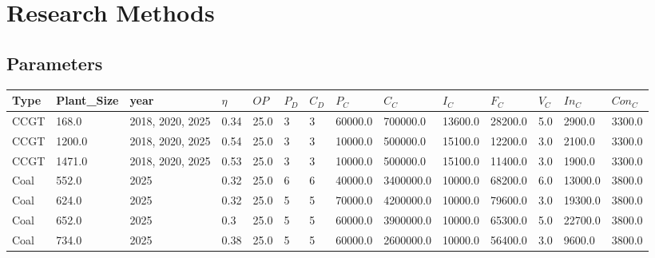\documentclass[sigconf]{acmart}
\begin{document}
%



% 
\appendix

\section{Research Methods}

\subsection{Parameters}

\begin{table*}[]
	\begin{tabularx}{\linewidth}{|p{}|l|l|l|l|l|l|l|l|l|l|l|l|l|}
\hline
Type                          & Plant\_Size & year             & $\eta$ & $OP$ & $P_D$ & $C_D$ & $P_C$    & $C_C$     & $I_C$    & $F_C$   & $V_C$ & $In_C$  & $Con_C$  \\ \hline
CCGT                          & 168.0       & 2018, 2020, 2025 & 0.34   & 25.0 & 3     & 3     & 60000.0  & 700000.0  & 13600.0  & 28200.0 & 5.0   & 2900.0  & 3300.0   \\ \hline
CCGT                          & 1200.0      & 2018, 2020, 2025 & 0.54   & 25.0 & 3     & 3     & 10000.0  & 500000.0  & 15100.0  & 12200.0 & 3.0   & 2100.0  & 3300.0   \\ \hline
CCGT                          & 1471.0      & 2018, 2020, 2025 & 0.53   & 25.0 & 3     & 3     & 10000.0  & 500000.0  & 15100.0  & 11400.0 & 3.0   & 1900.0  & 3300.0   \\ \hline
Coal                          & 552.0       & 2025             & 0.32   & 25.0 & 6     & 6     & 40000.0  & 3400000.0 & 10000.0  & 68200.0 & 6.0   & 13000.0 & 3800.0   \\ \hline
Coal                          & 624.0       & 2025             & 0.32   & 25.0 & 5     & 5     & 70000.0  & 4200000.0 & 10000.0  & 79600.0 & 3.0   & 19300.0 & 3800.0   \\ \hline
Coal                          & 652.0       & 2025             & 0.3    & 25.0 & 5     & 5     & 60000.0  & 3900000.0 & 10000.0  & 65300.0 & 5.0   & 22700.0 & 3800.0   \\ \hline
Coal                          & 734.0       & 2025             & 0.38   & 25.0 & 5     & 5     & 60000.0  & 2600000.0 & 10000.0  & 56400.0 & 3.0   & 9600.0  & 3800.0   \\ \hline

\end{tabularx}
\end{table*}
\end{document}
